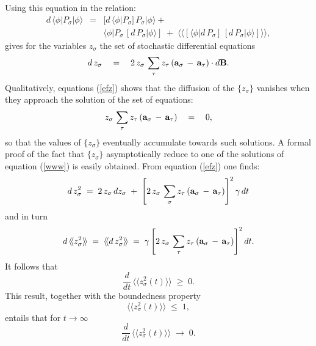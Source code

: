 \documentclass[10pt,a4paper]{article}
\newcommand{\llangle}{\langle\!\langle}
\newcommand{\rrangle}{\rangle\!\rangle}
\begin{document}
Using this equation in the relation:
\begin{eqnarray*}
d\, \langle \phi|P_{\sigma}|\phi \rangle & = & [d\,\langle
\phi|P_{\sigma}]\,P_{\sigma}|
\phi \rangle + \\
& & \langle \phi|P_{\sigma} \,[d\,P_{\sigma}|\phi \rangle] \; + \;
\llangle [\langle \phi|d\,P_{\sigma}] \,[d\,P_{\sigma}|\phi
\rangle] \rrangle,
\end{eqnarray*}
gives for the variables $z_{\sigma}$ the set of stochastic
differential equations
\begin{equation} \label{efz}
d\,z_{\sigma} \quad = \quad 2\,z_{\sigma}\, \sum_{\tau} z_{\tau}\,
({\bf a}_{\sigma} \, - \, {\bf a}_{\tau})\cdot d{\bf B}.
\end{equation}
Qualitatively, equations (\ref{efz}) shows that the diffusion of the
$\{z_{\sigma}\}$ vanishes when they approach the
solution of the set of equations:
\begin{equation} \label{www}
z_{\sigma}\, \sum_{\tau} z_{\tau} \, ({\bf a}_{\sigma} \, - \,
{\bf a}_{\tau}) \quad = \quad 0,
\end{equation}
so that the values of $\{z_{\sigma}\}$ eventually accumulate
towards such solutions. A formal proof of the fact that
$\{z_{\sigma}\}$ asymptotically reduce to one of the solutions of
equation (\ref{www}) is easily obtained. From equation (\ref{efz})
one finds:
\begin{equation}
d\, z^{2}_{\sigma} \; = \; 2\,z_{\sigma}\, dz_{\sigma} \; + \;
\left[ 2\,z_{\sigma}\, \sum_{\sigma} z_{\tau}\, ({\bf a}_{\sigma}
\, - \, {\bf a}_{\tau}) \right]^{2} \gamma\, dt
\end{equation}
and in turn
\begin{equation} \label{vmz}
d\, \llangle z^{2}_{\sigma} \rrangle \; = \; \llangle d\,
z^{2}_{\sigma} \rrangle \; = \; \gamma \left[2\,z_{\sigma}\,
\sum_{\tau} z_{\tau}\, ({\bf a}_{\sigma} \, - \, {\bf a}_{\tau})
\right]^{2} dt.
\end{equation}
It follows that
\begin{equation}
\frac{d}{dt}\, \llangle z^{2}_{\sigma}(t) \rrangle \; \geq \; 0.
\end{equation}
This result, together with the boundedness property
\begin{equation}
\llangle z^{2}_{\sigma}(t) \rrangle \; \leq \; 1,
\end{equation}
entails that for $t \rightarrow \infty$
\begin{equation}
\frac{d}{dt}\, \llangle z^{2}_{\sigma}(t) \rrangle \;
\longrightarrow \; 0.
\end{equation}
\end{document}
